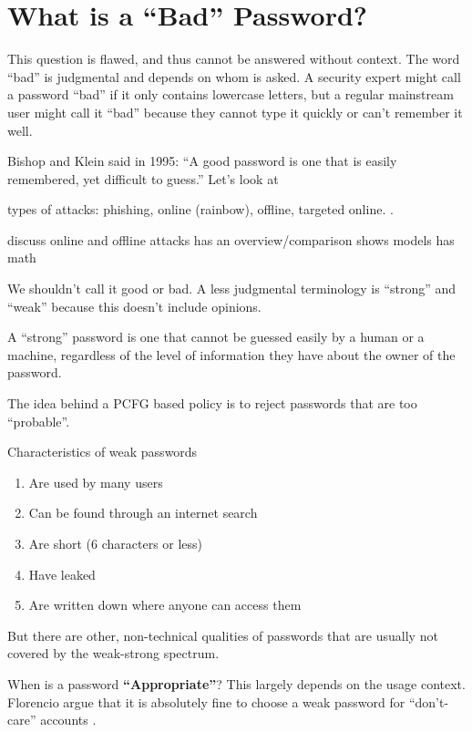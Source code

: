 \section{What is a ``Bad'' Password?}
This question is flawed, and thus cannot be answered without context. The word ``bad'' is judgmental and depends on whom is asked. A security expert might call a password ``bad'' if it only contains lowercase letters, but a regular mainstream user might call it ``bad'' because they cannot type it quickly or can't remember it well. 

Bishop and Klein said in 1995: ``A good password is one that is easily remembered, yet difficult to guess.'' \cite[p. 231]{Bishop1995ProactivePasswordChecking}
Let's look at 

types of attacks: phishing, online (rainbow), offline, targeted online. \cite{ZhangKennedy2016RevisitingPasswordRules}. 

discuss online and offline attacks
\cite{Wang2016fuzzyPWM} has an overview/comparison
\cite{Florencio2014AdministratorsGuide} shows models
\cite{Florencio2014PasswordPortfoliosFiniteUser} has math

We shouldn't call it good or bad. A less judgmental terminology is ``strong'' and ``weak'' because this doesn't include opinions. 

A ``strong'' password is one that cannot be guessed easily by a human or a machine, regardless of the level of information they have about the owner of the password. 


The idea behind a PCFG based policy is to reject passwords that are too ``probable''. 

Characteristics of weak passwords \cite{Burnett2005PerfectPasswords}
\begin{enumerate}
	\item Are used by many users
	\item Can be found through an internet search
	\item Are short (6 characters or less)
	\item Have leaked
	\item Are written down where anyone can access them
\end{enumerate}

But there are other, non-technical qualities of passwords that are usually not covered by the weak-strong spectrum. 

When is a password \textbf{``Appropriate''}? This largely depends on the usage context. \cite{Gaw2005ReuseRecycle, Haque2014Hierarchy}
Florencio \etal argue that it is absolutely fine to choose a weak password for ``don't-care'' accounts \cite{Florencio2014}.

